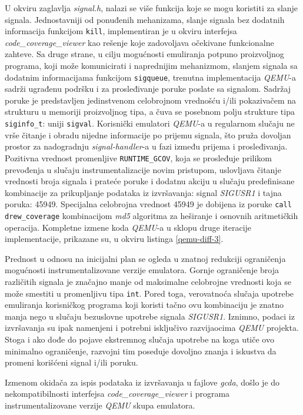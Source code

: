 \documentclass[12pt,oneside]{memoir}
\newcommand{\kod}[1]{\texttt{#1}}
\newcommand{\strano}[1]{\textit{#1}}
\begin{document}
U okviru zaglavlja \strano{signal.h}, nalazi se više funkcija koje se mogu koristiti za slanje signala. Jednostavniji od ponuđenih mehanizama, slanje signala bez dodatnih informacija funkcijom \kod{kill}, implementiran je u okviru interfejsa \strano{code\_coverage\_viewer} kao rešenje koje zadovoljava očekivane funkcionalne zahteve. Sa druge strane, u cilju mogućnosti emuliranja potpuno proizvoljnog programa, koji može komunicirati i naprednijim mehanizmom, slanjem signala sa dodatnim informacijama funkcijom \kod{sigqueue}, trenutna implementacija \strano{QEMU}-a sadrži ugrađenu podršku i za prosleđivanje poruke poslate sa signalom. Sadržaj poruke je predstavljen jedinstvenom celobrojnom vrednošću i/ili pokazivačem na strukturu u memoriji proizvoljnog tipa, a čuva se posebnom polju strukture tipa \kod{siginfo\_t}: uniji \kod{sigval}. Korisnički emulatori \strano{QEMU}-a u regularnom slučaju ne vrše čitanje i obradu nijedne informacije po prijemu signala, što pruža dovoljan prostor za nadogradnju \strano{signal-handler}-a u fazi između prijema i prosleđivanja. Pozitivna vrednost promenljive \kod{RUNTIME\_GCOV}, koja se prosleđuje prilikom prevođenja u slučaju instrumentalizacije novim pristupom, uslovljava čitanje vrednosti broja signala i prateće poruke i dodatnu akciju u slučaju predefinisane kombinacije za prikupljanje podataka iz izvršavanja: signal \strano{SIGUSR1} i tajna poruka: 45949. Specijalna celobrojna vrednost 45949 je dobijena iz poruke \kod{call drew\_coverage} kombinacijom \strano{md5} algoritma za heširanje i osnovnih aritmetičkih operacija. Kompletne izmene koda \strano{QEMU}-a u sklopu druge iteracije implementacije, prikazane su, u okviru listinga \ref{qemu-diff-3}.

Prednost u odnosu na inicijalni plan se ogleda u znatnoj redukciji ograničenja mogućnosti instrumentalizovane verzije emulatora. Gornje ograničenje broja različitih signala je značajno manje od maksimalne celobrojne vrednosti koja se može smestiti u promenljivu tipa \kod{int}. Pored toga, verovatnoća slučaja upotrebe emuliranja korisničkog programa koji koristi tačno ovu kombinaciju je znatno manja nego u slučaju bezuslovne upotrebe signala \strano{SIGUSR1}. Iznimno, podaci iz izvršavanja su ipak namenjeni i potrebni isključivo razvijaocima \strano{QEMU} projekta. Stoga i ako dođe do pojave ekstremnog slučaja upotrebe na koga utiče ovo minimalno ograničenje, razvojni tim poseduje dovoljno znanja i iskustva da promeni korišćeni signal i/ili poruku. 

Izmenom okidača za ispis podataka iz izvršavanja u fajlove \strano{gcda}, došlo je do nekompatibilnosti interfejsa \strano{code\_coverage\_viewer} i programa instrumentalizovane verzije \strano{QEMU} skupa emulatora. 
\end{document}

